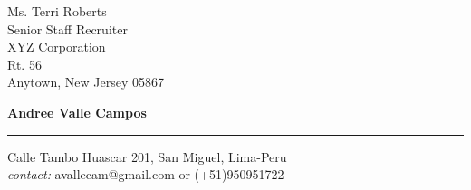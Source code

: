 \documentclass{letter} 					%
\begin{document}
\signature{Andree Valle Campos}         %
\longindentation=0pt                    %
\let\raggedleft\raggedright             %
 
 
\begin{letter}{
		Ms. Terri Roberts \\
		Senior Staff Recruiter \\
		XYZ Corporation \\
		Rt. 56 \\
		Anytown, New Jersey 05867
		}


\begin{flushleft}
{\large\bf Andree Valle Campos}
\end{flushleft}
\medskip\hrule height 1pt
\begin{flushright}
\hfill Calle Tambo Huascar 201, San Miguel, Lima-Peru \\
\hfill \textit{contact:} avallecam@gmail.com or (+51)950951722
\end{flushright} 
\vfill %

%
%
%
%
%
%



\end{letter}
\end{document}
